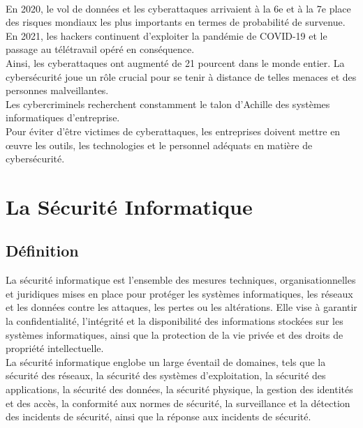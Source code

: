  \paragraph*{ }
 En 2020, le vol de données et les cyberattaques arrivaient à la 6e et à la 7e place des risques mondiaux les plus importants en termes de probabilité de survenue.\\ En 2021, les hackers continuent d’exploiter la pandémie de COVID-19 et le passage au télétravail opéré en conséquence.\\ Ainsi, les cyberattaques ont augmenté de 21 pourcent dans le monde entier. La cybersécurité joue un rôle crucial pour se tenir à distance de telles menaces et des personnes malveillantes.\\
 
 Les cybercriminels recherchent constamment le talon d’Achille des systèmes informatiques d’entreprise.\\ Pour éviter d’être victimes de cyberattaques, les entreprises doivent mettre en œuvre les outils, les technologies et le personnel adéquats en matière de cybersécurité.\\
\section{La Sécurité Informatique}
\subsection{Définition}
 La sécurité informatique est l'ensemble des mesures techniques, organisationnelles et juridiques mises en place pour protéger les systèmes informatiques, les réseaux et les données contre les attaques, les pertes ou les altérations. Elle vise à garantir la confidentialité, l'intégrité et la disponibilité des informations stockées sur les systèmes informatiques, ainsi que la protection de la vie privée et des droits de propriété intellectuelle. \\

 La sécurité informatique englobe un large éventail de domaines, tels que la sécurité des réseaux, la sécurité des systèmes d'exploitation, la sécurité des applications, la sécurité des données, la sécurité physique, la gestion des identités et des accès, la conformité aux normes de sécurité, la surveillance et la détection des incidents de sécurité, ainsi que la réponse aux incidents de sécurité.\\

